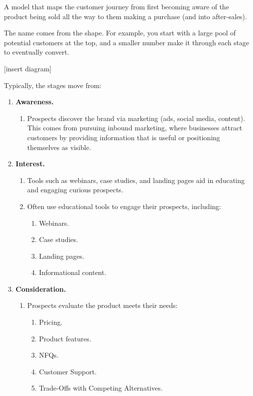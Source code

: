A model that maps the customer journey from first becoming aware of the product being sold all the way to them making a purchase (and into after-sales).

The name comes from the shape. For example, you start with a large pool of potential customers at the top, and a smaller number make it through each stage to eventually convert.

[insert diagram]

Typically, the stages move from:
\begin{enumerate}
    \item \textbf{Awareness.}
    \begin{enumerate}
        \item Prospects discover the brand via marketing (ads, social media, content). This comes from pursuing inbound marketing, where businesses attract customers by providing information that is useful or positioning themselves as visible.
    \end{enumerate}

    \item \textbf{Interest.}
    \begin{enumerate}
        \item Tools such as webinars, case studies, and landing pages aid in educating and engaging curious prospects.
        \item Often use educational tools to engage their prospects, including:
        \begin{enumerate}
            \item Webinars.
            \item Case studies.
            \item Landing pages.
            \item Informational content.
        \end{enumerate}
    \end{enumerate}

    \item \textbf{Consideration.}
    \begin{enumerate}
        \item Prospects evaluate the product meets their needs:
        \begin{enumerate}
            \item Pricing.
            \item Product features.
            \item NFQs.
            \item Customer Support.
            \item Trade-Offs with Competing Alternatives.
        \end{enumerate}
    \end{enumerate}


\end{enumerate}
